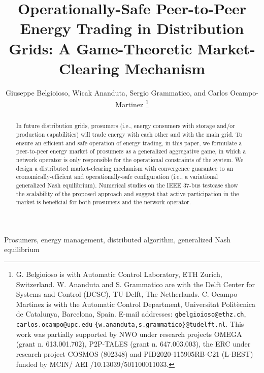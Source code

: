 \documentclass{IEEEtran}  %
\title{%
Operationally-Safe Peer-to-Peer Energy Trading in Distribution Grids: A Game-Theoretic Market-Clearing Mechanism
}
\author{Giuseppe Belgioioso, Wicak Ananduta, Sergio Grammatico, and Carlos Ocampo-Martinez
\thanks{
	G. Belgioioso is with Automatic Control Laboratory, ETH Zurich, Switzerland. W. Ananduta and S. Grammatico are with the Delft Center for Systems and Control (DCSC), TU Delft, The Netherlands. C. Ocampo-Martinez is with the Automatic Control Department, Universitat Polit\`{e}cnica de Catalunya, Barcelona, Spain. 
	E-mail addresses: \texttt{gbelgioioso@ethz.ch}, \texttt{carlos.ocampo@upc.edu} \texttt{\{w.ananduta,s.grammatico\}@tudelft.nl}. This work was partially supported by NWO under research projects OMEGA (grant n. 613.001.702), P2P-TALES (grant n. 647.003.003), the ERC under research project COSMOS (802348) and PID2020-115905RB-C21 (L-BEST) funded by MCIN/ AEI /10.13039/501100011033. 
}
}
\newcommand{\0}{\mathbf{0}}
\newcommand{\1}{\mathbf{1}}
\begin{document}
\maketitle

\begin{abstract}
In future distribution grids, prosumers (i.e., energy consumers with storage and/or production capabilities) will trade energy with each other and with the main grid.
%
To ensure an efficient and safe operation of energy trading, in this paper, we formulate a peer-to-peer energy market of prosumers as a generalized aggregative game, in which a network operator is only  responsible for the operational constraints of the system.
%
We design a distributed market-clearing mechanism with convergence guarantee to an economically-efficient and operationally-safe configuration (i.e., a variational generalized Nash equilibrium). 
%
Numerical studies on the IEEE 37-bus testcase show the scalability of the proposed approach and suggest that active participation in the market is beneficial for both prosumers and the network operator.  
\end{abstract}
\begin{IEEEkeywords}
	Prosumers, energy management, distributed algorithm, generalized Nash equilibrium
\end{IEEEkeywords}
\vspace{-10pt}
\end{document}
